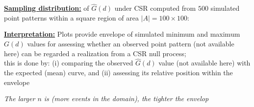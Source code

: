 \documentclass[portrait]{seminar}
\begin{document}
%
%
\begin{slide*}
\begin{center}
 \vspace*{-0.5cm} 
\end{center}


\vspace{0.5cm} \underline{\textbf{Sampling distribution:}} of
$\hat{G}(d)$ under CSR computed from $500$ simulated point patterns
within a square region of area $|A| = 100\times 100$:

\begin{center}
\begin{figure}
\hspace{-0.3cm}
 \hspace{0.5cm}
\end{figure}
\end{center}

\vspace{0.3cm} \underline{\textbf{Interpretation:}} Plots provide
envelope of simulated minimum and maximum $G(d)$ values for
assessing whether an observed point pattern (not available here) can
be regarded a realization from a CSR null process; \\ this is done
by: (i) comparing the observed $\hat{G}(d)$ value (not available
here) with the expected (mean) curve, and (ii) assessing its
relative position within the envelope

\vspace{0.5cm}
\begin{center}
\emph{The larger $n$ is (more events in the domain), the tighter the
envelop}
\end{center}


\end{slide*}
\end{document}
